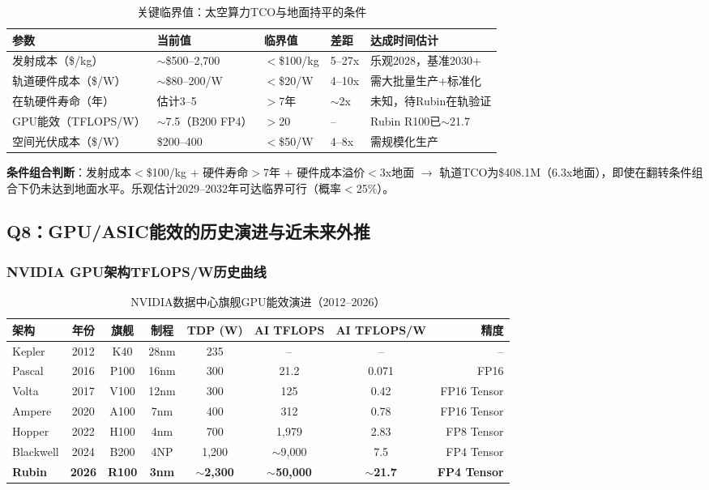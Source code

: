 \begin{table}[H]
\centering
\caption{关键临界值：太空算力TCO与地面持平的条件}
\label{tab:threshold}
\small
\begin{tabular}{lp{2.5cm}p{1.8cm}p{1.5cm}p{3.5cm}}
\toprule
\textbf{参数} & \textbf{当前值} & \textbf{临界值} & \textbf{差距} & \textbf{达成时间估计} \\
\midrule
发射成本（\$/kg） & $\sim$\$500--2,700 & $<$\$100/kg & 5--27x & 乐观2028，基准2030+ \\
轨道硬件成本（\$/W） & $\sim$\$80--200/W & $<$\$20/W & 4--10x & 需大批量生产+标准化 \\
在轨硬件寿命（年） & 估计3--5 & $>$7年 & $\sim$2x & 未知，待Rubin在轨验证 \\
GPU能效（TFLOPS/W） & $\sim$7.5（B200 FP4） & $>$20 & -- & Rubin R100已$\sim$21.7 \\
空间光伏成本（\$/W） & \$200--400 & $<$\$50/W & 4--8x & 需规模化生产 \\
\bottomrule
\end{tabular}
\end{table}

\textbf{条件组合判断}：发射成本$<$\$100/kg + 硬件寿命$>$7年 + 硬件成本溢价$<$3x地面 $\rightarrow$ 轨道TCO为\$408.1M（6.3x地面），即使在翻转条件组合下仍未达到地面水平。乐观估计2029--2032年可达临界可行（概率$<$25\%）。

\subsection{Q8：GPU/ASIC能效的历史演进与近未来外推}

\subsubsection{NVIDIA GPU架构TFLOPS/W历史曲线}

\begin{table}[H]
\centering
\caption{NVIDIA数据中心旗舰GPU能效演进（2012--2026）}
\label{tab:gpu_efficiency}
\footnotesize
\begin{tabularx}{\textwidth}{lccccccr}
\toprule
\textbf{架构} & \textbf{年份} & \textbf{旗舰} & \textbf{制程} & \textbf{TDP (W)} & \textbf{AI TFLOPS} & \textbf{AI TFLOPS/W} & \textbf{精度} \\
\midrule
Kepler & 2012 & K40 & 28nm & 235 & -- & -- & -- \\
Pascal & 2016 & P100 & 16nm & 300 & 21.2 & 0.071 & FP16 \\
Volta & 2017 & V100 & 12nm & 300 & 125 & 0.42 & FP16 Tensor \\
Ampere & 2020 & A100 & 7nm & 400 & 312 & 0.78 & FP16 Tensor \\
Hopper & 2022 & H100 & 4nm & 700 & 1,979 & 2.83 & FP8 Tensor \\
Blackwell & 2024 & B200 & 4NP & 1,200 & $\sim$9,000 & 7.5 & FP4 Tensor \\
\textbf{Rubin} & \textbf{2026} & \textbf{R100} & \textbf{3nm} & \textbf{$\sim$2,300} & \textbf{$\sim$50,000} & \textbf{$\sim$21.7} & \textbf{FP4 Tensor} \\
\bottomrule
\end{tabularx}
\end{table}

